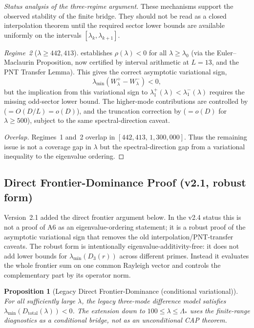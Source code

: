 \documentclass[12pt,a4paper]{article}
\newtheorem{proposition}[theorem]{Proposition}
\theoremstyle{definition}
\theoremstyle{remark}
\begin{document}
\begin{proof}[Status analysis of the three-regime argument]
\noindent These mechanisms support the observed stability of the finite bridge. They should not be read as a closed interpolation theorem until the required sector lower bounds are available uniformly on the intervals $[\lambda_k,\lambda_{k+1}]$.

\emph{Regime~2} ($\lambda \geq 442{,}413$).  establishes $\rho(\lambda) < 0$ for all $\lambda \geq \lambda_0$ (via the Euler--Maclaurin Proposition, now certified by interval arithmetic at $L = 13$, and the PNT Transfer Lemma). This gives the correct asymptotic variational sign,
\[
  \lambda_{\min}(W^+_\lambda-W^-_\lambda)<0,
\]
but the implication from this variational sign to
$\lambda_1^+(\lambda)<\lambda_1^-(\lambda)$ requires the missing odd-sector
lower bound. The higher-mode contributions are controlled by
 ($= O(D/L) = o(D)$), and the truncation correction
by  ($= o(D)$ for $\lambda \geq 500$), subject
to the same spectral-direction caveat.

\emph{Overlap.} Regimes~1 and~2 overlap in $[442{,}413,\, 1{,}300{,}000]$. Thus the remaining issue is not a coverage gap in $\lambda$ but the spectral-direction gap from a variational inequality to the eigenvalue ordering.
\end{proof}

\subsection{Direct Frontier-Dominance Proof (v2.1, robust form)}
\label{sec:direct-frontier}

Version~2.1 added the direct frontier argument below. In the v2.4 status this is not a proof of A6 as an eigenvalue-ordering statement; it is a robust proof of the asymptotic variational sign that removes the old interpolation/PNT-transfer caveats. The robust form is intentionally eigenvalue-additivity-free: it does not add lower bounds for $\lambda_{\min}(D_3(r))$ across different primes. Instead it evaluates the whole frontier sum on one common Rayleigh vector and controls the complementary part by its operator norm.

\begin{proposition}[Legacy Direct Frontier-Dominance (conditional variational)]
\label{prop:direct-frontier}
For all sufficiently large $\lambda$, the legacy three-mode difference model
satisfies $\lambda_{\min}(D_{\mathrm{total}}(\lambda)) < 0$. The extension down
to $100\leq\lambda\leq\Lambda_*$ uses the finite-range diagnostics as a
conditional bridge, not as an unconditional CAP theorem.
\end{proposition}
\end{document}
